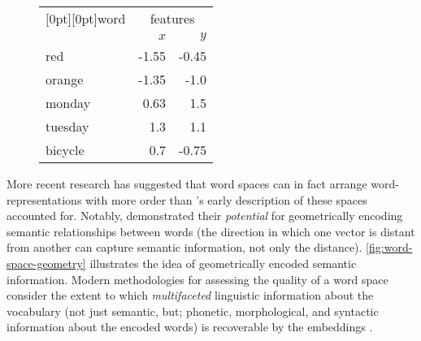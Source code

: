\documentclass{ucetd}
\begin{document}
{\begin{example}
\begin{figure}[H]
\begin{minipage}[t]{.4\textwidth}
    \end{minipage}\hspace{4em}
    \begin{minipage}[t]{.4\textwidth}
      \centering
      \vspace{0.5em}
      \begin{tabular}{l r r}
        \toprule
        \multicolumn{1}{c}{\raisebox{-9pt}[0pt][0pt]{\quad word\quad}} & \multicolumn{2}{c}{features} \\
        \cmidrule(lr){2-3}
        \quad\quad & $x$ & $y$ \\
        \midrule
        red     & -1.55 & -0.45   \\
        orange  & -1.35 & -1.0  \\
        monday  &  0.63 &  1.5   \\
        tuesday &  1.3  &  1.1   \\
        bicycle &  0.7  & -0.75  \\
        \bottomrule
      \end{tabular}
      \vspace{0.42em}
      \label{tab:2d-wvs}
    \end{minipage}
  \end{figure}
  \vspace{-0.5em}
\end{example}
More recent research has suggested that word spaces can in fact arrange word-representations with more order than \citeauthor{shutze-1993-word-space}'s early description of these spaces accounted for. Notably, \parencite{mikolov-etal-2013-linguistic} demonstrated their \emph{potential} for geometrically encoding semantic relationships between words (the direction in which one vector is distant from another can capture semantic information, not only the distance). \autoref{fig:word-space-geometry} illustrates the idea of geometrically encoded semantic information. Modern methodologies for assessing the quality of a word space consider the extent to which \emph{multifaceted} linguistic information about the vocabulary (not just semantic, but; phonetic, morphological, and syntactic information about the encoded words) is recoverable by the embeddings \parencite{yaghoobzadeh-schutze-2016-intrinsic, wang-2019-evaluating}.
\begin{figure}[H]
  \captionsetup{width=.91\linewidth}
  \centering
  \begin{minipage}[t]{.40\textwidth}
    \centering

\end{minipage}
\end{figure}}
\end{document}
